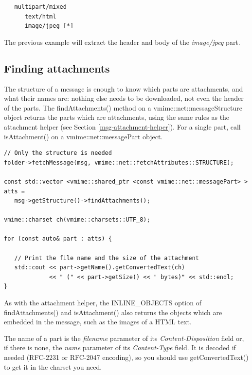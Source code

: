 \begin{verbatim}
   multipart/mixed
      text/html
      image/jpeg [*]
\end{verbatim}

The previous example will extract the header and body of the \emph{image/jpeg}
part.

\subsection{Finding attachments} %

The structure of a message is enough to know which parts are attachments,
and what their names are: nothing else needs to be downloaded, not even the
header of the parts. The {\vcode findAttachments()} method on a
{\vcode vmime::net::messageStructure} object returns the parts which are
attachments, using the same rules as the attachment helper (see Section
\ref{msg-attachment-helper}). For a single part, call
{\vcode isAttachment()} on a {\vcode vmime::net::messagePart} object.

\begin{lstlisting}[caption={Finding attachments in the structure of a message}]
// Only the structure is needed
folder->fetchMessage(msg, vmime::net::fetchAttributes::STRUCTURE);

const std::vector <vmime::shared_ptr <const vmime::net::messagePart> > atts =
   msg->getStructure()->findAttachments();

vmime::charset ch(vmime::charsets::UTF_8);

for (const auto& part : atts) {

   // Print the file name and the size of the attachment
   std::cout << part->getName().getConvertedText(ch)
             << " (" << part->getSize() << " bytes)" << std::endl;
}
\end{lstlisting}

As with the attachment helper, the {\vcode INLINE\_OBJECTS} option of
{\vcode findAttachments()} and {\vcode isAttachment()} also returns the
objects which are embedded in the message, such as the images of a HTML
text.

The name of a part is the \emph{filename} parameter of its
\emph{Content-Disposition} field or, if there is none, the \emph{name}
parameter of its \emph{Content-Type} field. It is decoded if needed (RFC-2231
or RFC-2047 encoding), so you should use {\vcode getConvertedText()} to get
it in the charset you need.


